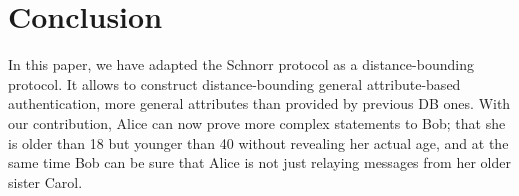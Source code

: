 \section{Conclusion}%
\label{Conclusion}

In this paper, we have adapted the Schnorr protocol as a
distance-bounding protocol.  It allows to construct distance-bounding
general attribute-based authentication, more general attributes than
provided by previous \ac{DB} ones.  With our contribution, Alice can
now prove more complex statements to Bob; \eg that she is older than
18 but younger than 40 without revealing her actual age, and at the
same time Bob can be sure that Alice is not just relaying messages
from her older sister Carol.


